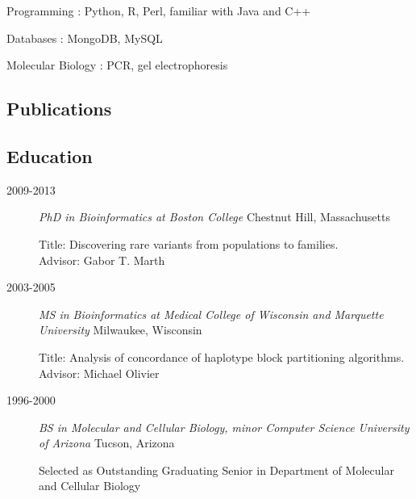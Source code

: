 \documentclass[]{article}
\begin{document}
Programming : Python, R, Perl, familiar with Java and C++

Databases : MongoDB, MySQL

Molecular Biology : PCR, gel electrophoresis

\subsection{Publications}\label{selected-publications}

 
 
\nocite{*}



\subsection{Education}\label{education}

\begin{description}
\item[2009-2013]
\emph{PhD in Bioinformatics at Boston College} Chestnut Hill, Massachusetts

Title: Discovering rare variants from populations to families. \\
Advisor: Gabor T. Marth
\item[2003-2005]
\emph{MS in Bioinformatics at Medical College of Wisconsin and Marquette
University} Milwaukee, Wisconsin

Title: Analysis of concordance of haplotype block partitioning
algorithms. Advisor: Michael Olivier
\item[1996-2000]
\emph{BS in Molecular and Cellular Biology, minor Computer Science
University of Arizona} Tucson, Arizona

Selected as Outstanding Graduating Senior in Department of Molecular and
Cellular Biology
\end{description}

%
%
\end{document}
